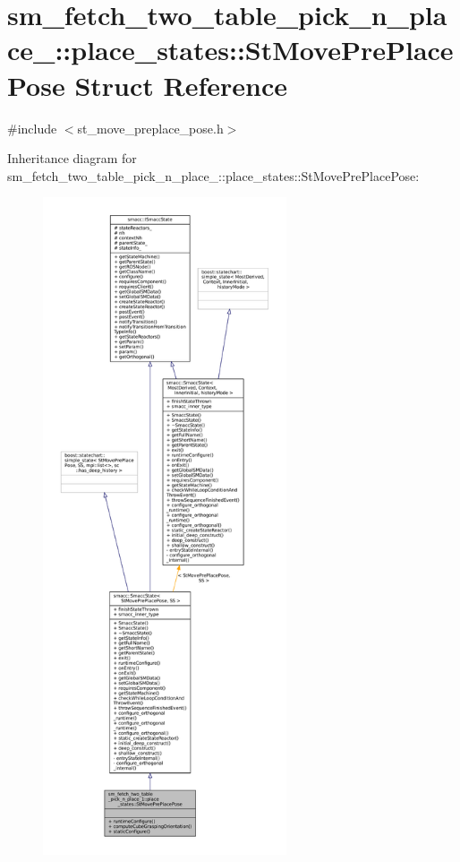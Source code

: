 \hypertarget{structsm__fetch__two__table__pick__n__place__1_1_1place__states_1_1StMovePrePlacePose}{}\section{sm\+\_\+fetch\+\_\+two\+\_\+table\+\_\+pick\+\_\+n\+\_\+place\+\_\+:\+:place\+\_\+states\+:\+:St\+Move\+Pre\+Place\+Pose Struct Reference}
\label{structsm__fetch__two__table__pick__n__place__1_1_1place__states_1_1StMovePrePlacePose}


{\ttfamily \#include $<$st\+\_\+move\+\_\+preplace\+\_\+pose.\+h$>$}



Inheritance diagram for sm\+\_\+fetch\+\_\+two\+\_\+table\+\_\+pick\+\_\+n\+\_\+place\+\_\+:\+:place\+\_\+states\+:\+:St\+Move\+Pre\+Place\+Pose\+:
\nopagebreak
\begin{figure}[H]
\begin{center}
\leavevmode
\includegraphics[height=550pt]{structsm__fetch__two__table__pick__n__place__1_1_1place__states_1_1StMovePrePlacePose__inherit__graph}
\end{center}
\end{figure}


